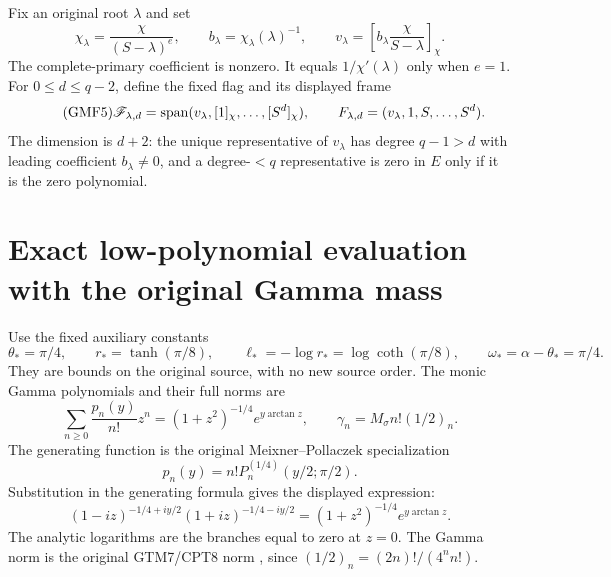 Fix an original root \(\lambda\) and set
\begin{equation}\tag{GMF4}
 \chi_\lambda=\frac{\chi}{(S-\lambda)^e},\qquad
 b_\lambda=\chi_\lambda(\lambda)^{-1},\qquad
 v_\lambda=\left[b_\lambda\frac{\chi}{S-\lambda}\right]_\chi .
\end{equation}
The complete-primary coefficient is nonzero.
It equals \(1/\chi'(\lambda)\) only when \(e=1\).
For \(0\le d\le q-2\), define the fixed flag and its displayed frame
\begin{equation}\tag{GMF5}
 \mathscr F_{\lambda,d}
 =\operatorname{span}(v_\lambda,[1]_\chi,\ldots,[S^d]_\chi),
 \qquad F_{\lambda,d}=(v_\lambda,1,S,\ldots,S^d).
\end{equation}
The dimension is \(d+2\): the unique representative of
\(v_\lambda\) has degree \(q-1>d\) with leading coefficient
\(b_\lambda\ne0\), and a degree-\(<q\) representative is zero
in \(E\) only if it is the zero polynomial.

\section{Exact low-polynomial evaluation with the original Gamma mass}

Use the fixed auxiliary constants
\begin{equation}\tag{GMF6}
 \theta_*=\pi/4,\qquad
 r_*=\tanh(\pi/8),\qquad
 \ell_*=-\log r_*=\log\coth(\pi/8),\qquad
 \omega_*=\alpha-\theta_*=\pi/4.
\end{equation}
They are bounds on the original source, with no new source order.
The monic Gamma polynomials and their full norms are
\[
 \sum_{n\ge0}\frac{p_n(y)}{n!}z^n
 =(1+z^2)^{-1/4}e^{y\arctan z},\qquad
 \gamma_n=M_\sigma n!(1/2)_n.
\]
The generating function is the original
Meixner--Pollaczek specialization
\[p_n(y)=n!P_n^{(1/4)}(y/2;\pi/2).\]
Substitution in the generating formula
\cite[(18.23.7)]{a02gmf:dlmfMPgen} gives the displayed expression:
\[
 (1-iz)^{-1/4+iy/2}(1+iz)^{-1/4-iy/2}
       =(1+z^2)^{-1/4}e^{y\arctan z}.
\]
The analytic logarithms are the branches equal to zero at \(z=0\).
The Gamma norm is the original GTM7/CPT8 norm
\cite{a02gmf:providers,a02gmf:cpt}, since
\((1/2)_n=(2n)!/(4^n n!)\).

